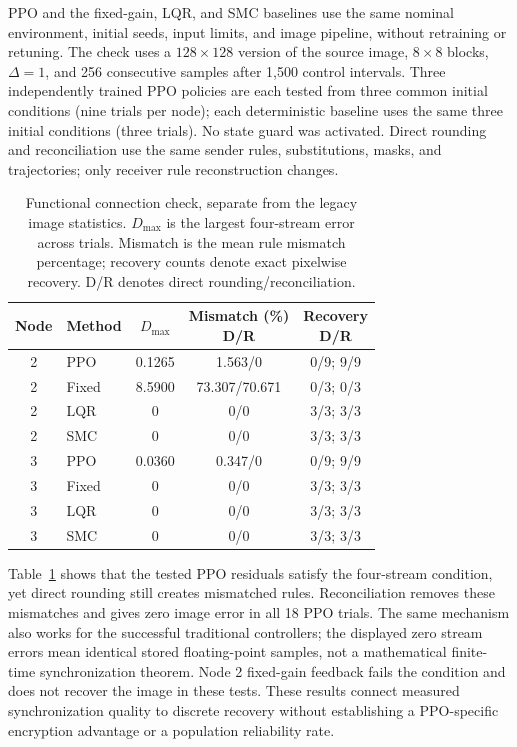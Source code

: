 \documentclass[a4paper,fleqn]{cas-dc}
\theoremstyle{plain}
\theoremstyle{definition}
\begin{document}
PPO and the fixed-gain, LQR, and SMC baselines use the same nominal environment, initial seeds, input limits, and image pipeline, without retraining or retuning. The check uses a $128\times128$ version of the source image, $8\times8$ blocks, $\Delta=1$, and 256 consecutive samples after 1,500 control intervals. Three independently trained PPO policies are each tested from three common initial conditions (nine trials per node); each deterministic baseline uses the same three initial conditions (three trials). No state guard was activated. Direct rounding and reconciliation use the same sender rules, substitutions, masks, and trajectories; only receiver rule reconstruction changes.

\begin{table}[pos=htbp,width=\linewidth]
\centering\small
\setlength{\tabcolsep}{3pt}
\caption{Functional connection check, separate from the legacy image statistics. $D_{\max}$ is the largest four-stream error across trials. Mismatch is the mean rule mismatch percentage; recovery counts denote exact pixelwise recovery. D/R denotes direct rounding/reconciliation.}
\label{tab:sync_application_bridge}
\begin{tabular}{@{}clccc@{}}
\toprule
Node & Method & $D_{\max}$ & \makecell{Mismatch (\%)\\D/R} & \makecell{Recovery\\D/R}\\
\midrule
2 & PPO & 0.1265 & 1.563/0 & 0/9; 9/9\\
2 & Fixed & 8.5900 & 73.307/70.671 & 0/3; 0/3\\
2 & LQR & 0 & 0/0 & 3/3; 3/3\\
2 & SMC & 0 & 0/0 & 3/3; 3/3\\
3 & PPO & 0.0360 & 0.347/0 & 0/9; 9/9\\
3 & Fixed & 0 & 0/0 & 3/3; 3/3\\
3 & LQR & 0 & 0/0 & 3/3; 3/3\\
3 & SMC & 0 & 0/0 & 3/3; 3/3\\
\bottomrule
\end{tabular}
\end{table}

Table~\ref{tab:sync_application_bridge} shows that the tested PPO residuals satisfy the four-stream condition, yet direct rounding still creates mismatched rules. Reconciliation removes these mismatches and gives zero image error in all 18 PPO trials. The same mechanism also works for the successful traditional controllers; the displayed zero stream errors mean identical stored floating-point samples, not a mathematical finite-time synchronization theorem. Node 2 fixed-gain feedback fails the condition and does not recover the image in these tests. These results connect measured synchronization quality to discrete recovery without establishing a PPO-specific encryption advantage or a population reliability rate.
\end{document}
